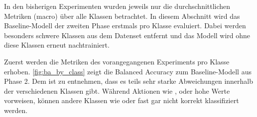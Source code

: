 In den bisherigen Experimenten wurden jeweils nur die durchschnittlichen Metriken (macro) über alle Klassen betrachtet.
In diesem Abschnitt wird das Baseline-Modell der zweiten Phase erstmals pro Klasse evaluiert.
Dabei werden besonders schwere Klassen aus dem Datenset entfernt und das Modell wird ohne diese Klassen erneut nachtrainiert.

Zuerst werden die Metriken des vorangegangenen Experiments pro Klasse erhoben.
\autoref{fig:ba_by_class} zeigt die Balanced Accuracy zum Baseline-Modell aus Phase 2.
Dem ist zu entnehmen, dass es teils sehr starke Abweichungen innerhalb der verschiedenen Klassen gibt.
Während Aktionen wie ,  oder  hohe Werte vorweisen, können andere Klassen wie  oder  fast gar nicht korrekt klassifiziert werden.


